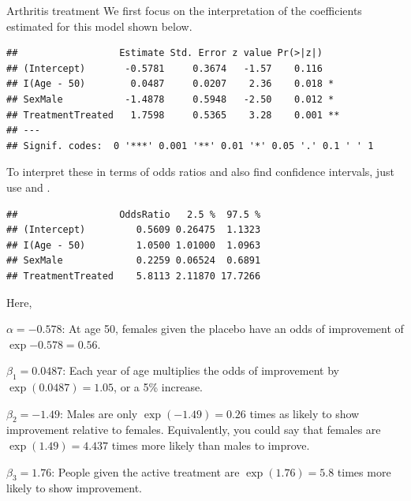 \documentclass[11pt]{book}
\renewenvironment{knitrout}{\small\renewcommand{\baselinestretch}{.85}}{} %
\begin{document}
\begin{Example}{Arthritis treatment}
We first focus on the interpretation of the coefficients estimated for this model
shown below.
\begin{knitrout}
\color{fgcolor}\begin{kframe}
\begin{alltt}
\end{alltt}
\begin{verbatim}
##                  Estimate Std. Error z value Pr(>|z|)   
## (Intercept)       -0.5781     0.3674   -1.57    0.116   
## I(Age - 50)        0.0487     0.0207    2.36    0.018 * 
## SexMale           -1.4878     0.5948   -2.50    0.012 * 
## TreatmentTreated   1.7598     0.5365    3.28    0.001 **
## ---
## Signif. codes:  0 '***' 0.001 '**' 0.01 '*' 0.05 '.' 0.1 ' ' 1
\end{verbatim}
\end{kframe}
\end{knitrout}
To interpret these in terms of odds ratios and also find confidence intervals,
just use  and .
\begin{knitrout}
\color{fgcolor}\begin{kframe}
\begin{alltt}
\hlstd{(}\hlstd{(}\hlstd{=}
\end{alltt}
\begin{verbatim}
##                  OddsRatio   2.5 %  97.5 %
## (Intercept)         0.5609 0.26475  1.1323
## I(Age - 50)         1.0500 1.01000  1.0963
## SexMale             0.2259 0.06524  0.6891
## TreatmentTreated    5.8113 2.11870 17.7266
\end{verbatim}
\end{kframe}
\end{knitrout}
Here,
\begin{itemize*}
  \item $\alpha = -0.578$: At age 50, females given the placebo have an odds of improvement
  of  $\exp{-0.578} = 0.56$.
  \item $\beta_1 = 0.0487$: Each year of age multiplies the odds of improvement by
  $\exp(0.0487) = 1.05$, or a 5\% increase.
  \item $\beta_2 = -1.49$: Males are only $\exp(-1.49) = 0.26$ times as likely to show
  improvement relative to females.  Equivalently, you could say that females are
  $\exp(1.49) = 4.437$ times more likely than males to improve.
  \item $\beta_3 = 1.76$: People given the active treatment are $\exp(1.76) = 5.8$
  times more likely to show improvement.
\end{itemize*}


\end{Example}
\end{document}
